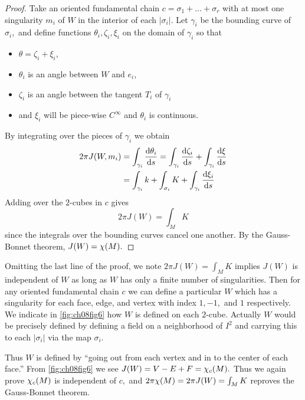 \documentclass[../main]{subfiles}
\begin{document}
\begin{proof}
Take an oriented fundamental chain $c=\sigma_1+\ldots+\sigma_r$ with at most one singularity $m_i$ of $W$ in the interior of each $|\sigma_i|.$ Let $\gamma_i$ be the bounding curve of $\sigma_i,$ and define 
functions $\theta_i,\zeta_i,\xi_i$  on the domain of $\gamma_i$ so that 
\begin{itemize}
    \item $\theta=\zeta_i+\xi_i$,
    \item $\theta_i$ is an angle between $W$ and $e_i$,
    \item $\zeta_i$ is an angle between the tangent $T_i$ of $\gamma_i$
    \item and $\xi_i$ will be piece-wise $C^\infty$ and $\theta_i$ is continuous.
\end{itemize}
By integrating over the pieces of $\gamma_i$ we obtain
\begin{align*}
    2\pi J(W,m_i)&=\int_{\gamma_i}\dfrac{\mathrm{d}\theta_i}{\mathrm{d}s}=\int_{\gamma_i}\dfrac{\mathrm{d}\zeta_i}{\mathrm{d}s}+\int_{\gamma_i}\dfrac{\mathrm{d}\xi}{\mathrm{d}s} \\
    &=\int_{\gamma_i}k+\int_{\sigma_i}K+\int_{\gamma_i}\dfrac{\mathrm{d}\xi_i}{\mathrm{d}s}
\end{align*}
Adding over the $2$-cubes in $c$ gives
\begin{equation}\tag{5}\label{eq:ch08.5}
    2\pi J(W)=\int_{M}K
\end{equation}
since the integrals over the bounding curves cancel one another. By the Gauss-Bonnet theorem, $J(W)=\chi(M).$
\end{proof}



Omitting the last line of the proof, we note $2\pi J(W)=\int_{M}K$ implies $J(W)$ is independent of $W$ as long as $W$ has only a finite number of singularities. Then for any oriented fundamental chain $c$ we can define a particular $W$ which has a singularity for each face, edge, and vertex with index $1,-1,$ and $1$ respectively. We indicate in \ref{fig:ch08fig6} how $W$ is defined on each $2$-cube. Actually $W$ would be precisely defined by defining a field on a neighborhood of $I^2$ and carrying this to each $|\sigma_i|$ via the map $\sigma_i.$



Thus $W$ is defined by ``going out from each vertex and in to the center of each face.'' From \ref{fig:ch08fig6} we see $J(W)=V-E+F=\chi_c(M).$ Thus we again prove $\chi_c(M)$ is independent of $c,$ and $2\pi\chi(M)=2\pi J(W)=\int_{M}K$ reproves the Gauss-Bonnet theorem. 
\end{document}
